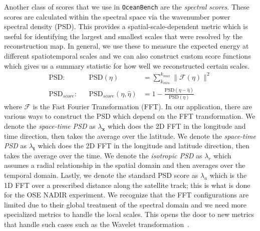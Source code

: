 Another class of scores that we use in \texttt{OceanBench} are the \textit{spectral scores}. These scores are calculated within the spectral space via the wavenumber power spectral density (PSD). 
This provides a spatial-scale-dependent metric which is useful for identifying the largest and smallest scales that were resolved by the reconstruction map. 
In general, we use these to measure the expected energy at different spatiotemporal scales and we can also construct custom score functions which gives us a summary statistic for how well we reconstructed certain scales.
%
\begin{align}
    \text{PSD}: &&\text{PSD}(\eta) &= \sum_{k_{min}}^{k_{max}}\|\mathcal{\mathcal{F}(\eta)}\|^2\label{psd}\\
    \text{PSD}_{score}: &&\text{PSD}_{score}(\eta,\hat{\eta}) &= 1 - \frac{\text{PSD}(\eta - \hat{\eta})}{\text{PSD}(\eta)} \label{eq:psd_score}
\end{align}
%
where $\mathcal{F}$ is the Fast Fourier Transformation (FFT). 
In our application, there are various ways to construct the PSD which depend on the FFT transformation.
We denote the \textit{space-time PSD} as $\lambda_\mathbf{x}$ which does the 2D FFT in the longitude and time direction, then takes the average over the latitude.
We denote the \textit{space-time PSD} as $\lambda_\mathbf{t}$ which does the 2D FFT in the longitude and latitude direction, then takes the average over the time.
We denote the \textit{isotropic PSD} as $\lambda_r$ which assumes a radial relationship in the spatial domain and then averages over the temporal domain.
Lastly, we denote the standard PSD score as $\lambda_a$ which is the 1D FFT over a prescribed distance along the satellite track; this is what is done for the OSE NADIR experiment.
We recognize that the FFT configurations are limited due to their global treatment of the spectral domain and we need more specialized metrics to handle the local scales.
This opens the door to new metrics that handle such cases such as the Wavelet transformation~\cite{METRICSWAVELET}.



